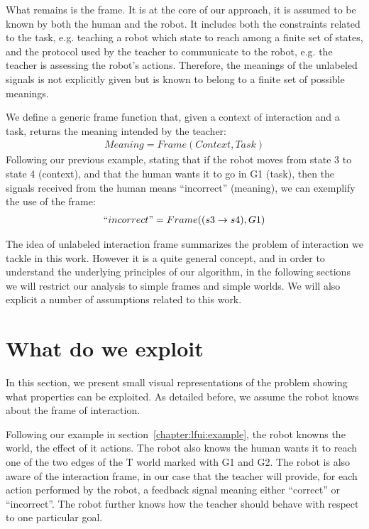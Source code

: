 What remains is the frame. It is at the core of our approach, it is assumed to be known by both the human and the robot. It includes both the constraints related to the task, e.g. teaching a robot which state to reach among a finite set of states, and the protocol used by the teacher to communicate to the robot, e.g. the teacher is assessing the robot's actions. Therefore, the meanings of the unlabeled signals is not explicitly given but is known to belong to a finite set of possible meanings.

We define a generic frame function that, given a context of interaction and a task, returns the meaning intended by the teacher:
%
\begin{eqnarray}
Meaning = Frame(Context, Task)
\end{eqnarray}
%
Following our previous example, stating that if the robot moves from state 3 to state 4 (context), and that the human wants it to go in G1 (task), then the signals received from the human means ``incorrect'' (meaning), we can exemplify the use of the frame:
%
\begin{eqnarray}
``incorrect" = Frame((s3 \rightarrow s4), G1)
\end{eqnarray}

\transition

The idea of unlabeled interaction frame summarizes the problem of interaction we tackle in this work. However it is a quite general concept, and in order to understand the underlying principles of our algorithm, in the following sections we will restrict our analysis to simple frames and simple worlds. We will also explicit a number of assumptions related to this work.

\section{What do we exploit}

In this section, we present small visual representations of the problem showing what properties can be exploited. As detailed before, we assume the robot knows about the frame of interaction. 

Following our example in section~\ref{chapter:lfui:example}, the robot knowns the world, the effect of it actions. The robot also knows the human wants it to reach one of the two edges of the T world marked with G1 and G2. The robot is also aware of the interaction frame, in our case that the teacher will provide, for each action performed by the robot, a feedback signal meaning either ``correct'' or ``incorrect''. The robot further knows how the teacher should behave with respect to one particular goal.

